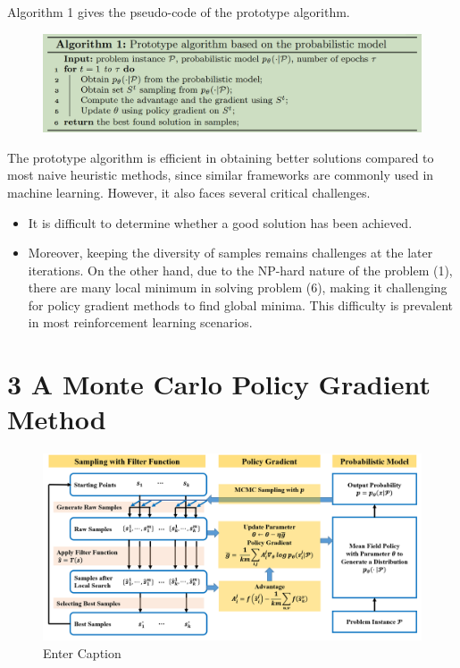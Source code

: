 Algorithm 1 gives the pseudo-code of the prototype algorithm. 
\begin{figure}
    \centering
    \includegraphics[width=1\linewidth]{Images/MCPG_ALG_1.png}
\end{figure}
The prototype algorithm is efficient in obtaining better solutions compared to most naive heuristic methods, since similar frameworks are commonly used in machine learning. However, it also faces several critical challenges. 
\begin{itemize}
    \item It is difficult to determine whether a good solution has been achieved.
    \item Moreover, keeping the diversity of samples remains challenges at the later iterations. On the other hand, due to the NP-hard nature of the problem (1), there are many local minimum in solving problem (6), making it challenging for policy gradient methods to find global minima. This difficulty is prevalent in most reinforcement learning scenarios.
\end{itemize}

\section{3 A Monte Carlo Policy Gradient Method} %

\begin{figure}
    \centering
    \includegraphics[width=1\linewidth]{Images/MCPG_pipeline.png}
    \caption{Enter Caption}
    \label{fig:enter-label}
\end{figure}

